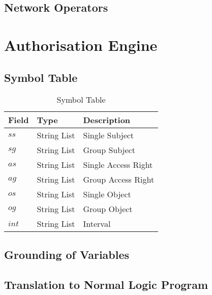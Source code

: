 \documentclass[11pt]{report}
\begin{document}
      \subsection{Network Operators}

    \section{Authorisation Engine}

      \subsection{Symbol Table}

        \begin{table}[tbhp]
          \begin{center}
            \begin{tabular}[t]{|l|l|l|}
              \hline
              {\bf Field} & {\bf Type} & {\bf Description} \\
              \hline
              $ss$  & String List & Single Subject \\
              \hline
              $sg$  & String List & Group Subject \\
              \hline
              $as$  & String List & Single Access Right \\
              \hline
              $ag$  & String List & Group Access Right \\
              \hline
              $os$  & String List & Single Object \\
              \hline
              $og$  & String List & Group Object \\
              \hline
              $int$ & String List & Interval \\
              \hline
            \end{tabular}
          \end{center}
          \caption[]{Symbol Table}
          \label{table-symtab}
        \end{table}

      \subsection{Grounding of Variables}

      \subsection{Translation to Normal Logic Program}
\end{document}
